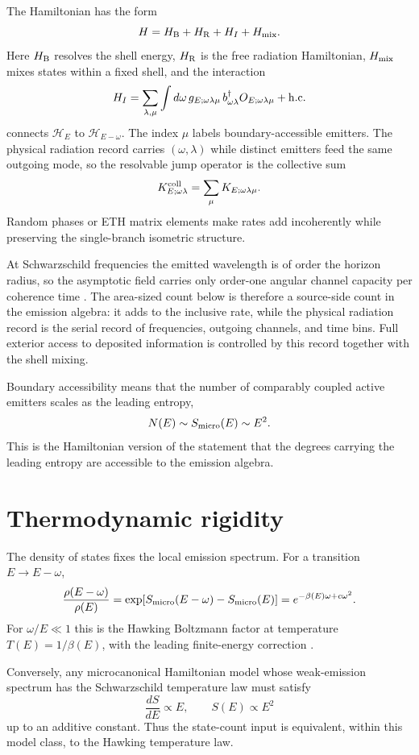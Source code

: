 \documentclass[12pt]{article}
\newcommand{\be}{\begin{equation}}
\newcommand{\ee}{\end{equation}}
\newcommand{\Smicro}{S_{\rm micro}}
\begin{document}
The Hamiltonian has the form
\be
  H=H_{\rm B}+H_{\rm R}+H_I+H_{\rm mix}.
\ee
Here $H_{\rm B}$ resolves the shell energy, $H_{\rm R}$ is the free radiation
Hamiltonian, $H_{\rm mix}$ mixes states within a fixed shell, and the
interaction
\be
  H_I=
  \sum_{\lambda,\mu}\int d\omega\,
  g_{E;\omega\lambda\mu}\,
  b^\dagger_{\omega\lambda} O_{E;\omega\lambda\mu}
  +{\rm h.c.}
\ee
connects $\mathcal H_E$ to $\mathcal H_{E-\omega}$.  The index $\mu$ labels
boundary-accessible emitters.  The physical radiation record carries
$(\omega,\lambda)$ while distinct emitters feed the same outgoing mode, so the
resolvable jump operator is the collective sum
\be
  K^{\rm coll}_{E;\omega\lambda}
  =
  \sum_\mu K_{E;\omega\lambda\mu}.
\ee
Random phases or ETH matrix elements make rates add incoherently while
preserving the single-branch isometric structure.

At Schwarzschild frequencies the emitted wavelength is of order the horizon
radius, so the asymptotic field carries only order-one angular channel capacity
per coherence time \cite{Page1976,BekensteinMayo2001,Pendry1983}.  The
area-sized count below is therefore a source-side count in the emission
algebra: it adds to the inclusive rate, while the physical radiation record is
the serial record of frequencies, outgoing channels, and time bins.  Full
exterior access to deposited information is controlled by this record together
with the shell mixing.

Boundary accessibility means that the number of comparably coupled active
emitters scales as the leading entropy,
\be
  N(E)\sim \Smicro(E)\sim E^2 .
\ee
This is the Hamiltonian version of the statement that the degrees carrying the
leading entropy are accessible to the emission algebra.

\section{Thermodynamic rigidity}

The density of states fixes the local emission spectrum.  For a transition
$E\to E-\omega$,
\be
  \frac{\rho(E-\omega)}{\rho(E)}
  =
  \exp[\Smicro(E-\omega)-\Smicro(E)]
  =
  e^{-\beta(E)\omega+c\omega^2}.
\ee
For $\omega/E\ll 1$ this is the Hawking Boltzmann factor at temperature
$T(E)=1/\beta(E)$, with the leading finite-energy correction
\cite{ParikhWilczek2000}.

Conversely, any microcanonical Hamiltonian model whose weak-emission spectrum
has the Schwarzschild temperature law must satisfy
\be
  \frac{dS}{dE}\propto E,
  \qquad
  S(E)\propto E^2
\ee
up to an additive constant.  Thus the state-count input is equivalent, within
this model class, to the Hawking temperature law.
\end{document}
